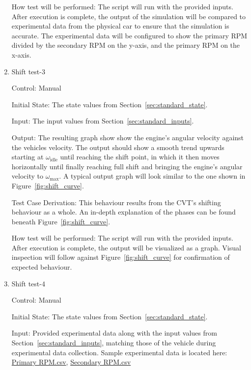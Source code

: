 \documentclass[12pt, titlepage]{article}
\begin{document}
\begin{enumerate}
  How test will be performed: The script will run with the provided inputs. After execution is complete, the output of the simulation will be compared to experimental data from the physical car to ensure that the simulation is accurate. The experimental data will be configured to show the primary RPM divided by the secondary RPM on the y-axis, and the primary RPM on the x-axis.
  
  \item{Shift test-3\\}
  
  Control: Manual
            
  Initial State: The state values from Section~\ref{sec:standard_state}.
  
  Input: The input values from Section~\ref{sec:standard_inputs}.
            
  Output: The resulting graph show show the engine's angular velocity against the vehicles velocity. The output should show a smooth trend upwards starting at $\omega_\text{idle}$ until reaching the shift point, in which it then moves horizontally until finally reaching full shift and bringing the engine's angular velocity to $\omega_\text{max}$. A typical output graph will look similar to the one shown in Figure~\ref{fig:shift_curve}.
  
  Test Case Derivation: This behaviour results from the CVT's shifting behaviour as a whole. An in-depth explanation of the phases can be found beneath Figure~\ref{fig:shift_curve}.
  
  How test will be performed: The script will run with the provided inputs. After execution is complete, the output will be visualized as a graph. Visual inspection will follow against Figure~\ref{fig:shift_curve} for confirmation of expected behaviour.
  
  \item{Shift test-4\\}

  Control: Manual

  Initial State: The state values from Section~\ref{sec:standard_state}.

  Input: Provided experimental data along with the input values from Section~\ref{sec:standard_inputs}, matching those of the vehicle during experimental data collection. Sample experimental data is located here: \href{https://github.com/gr812b/CVT-Simulator/experimental-data/RPM%20PRIM.csv}{Primary RPM.csv}, \href{https://github.com/gr812b/CVT-Simulator/experimental-data/RPM%20SEC.csv}{Secondary RPM.csv} 


\end{enumerate}
\end{document}
